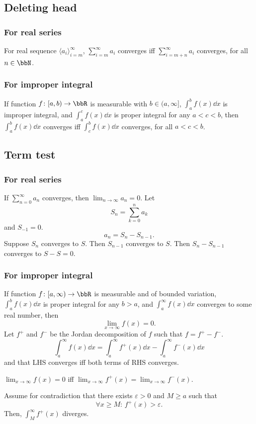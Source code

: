\documentclass[a4paper,12pt]{report}
\begin{document}
\begin{itemize}
\begin{itemize}
\subsection{Deleting head}
\subsubsection{For real series}
For real sequence $\langle a_i\rangle_{i=m}^{\infty}$, $\sum_{i=m}^{\infty}a_i$ converges iff $\sum_{i=m+n}^{\infty}a_i$ converges, for all $n\in\bbN$.
\subsubsection{For improper integral}
If function $f\colon [a,b)\to\bbR$ is measurable with $b\in(a,\infty]$, $\int_a^bf(x)\dd{x}$ is improper integral, and $\int_a^cf(x)\dd{x}$ is proper integral for any $a<c<b$, then $\int_a^bf(x)\dd{x}$ converges iff $\int_c^bf(x)\dd{x}$ converges, for all $a<c<b$.
\subsection{Term test}
\subsubsection{For real series}
If $\sum_{n=0}^{\infty}a_n$ converges, then $\lim_{n\to\infty}a_n=0$.
\bpr
Let
\[S_n=\sum_{k=0}^na_k\]
and $S_{-1}=0$.
\[a_n=S_n-S_{n-1}.\]
Suppose $S_n$ converges to $S$. Then $S_{n-1}$ converges to $S$. Then $S_n-S_{n-1}$ converges to $S-S=0$.
\epr
\subsubsection{For improper integral}
If function $f\colon [a,\infty)\to\bbR$ is measurable and of bounded variation, $\int_a^bf(x)\dd{x}$ is proper integral for any $b>a$, and $\int_a^{\infty}f(x)\dd{x}$ converges to some real number, then
\[\lim_{x\to\infty}f(x)=0.\]
\bpr
Let $f^+$ and $f^-$ be the Jordan decomposition of $f$ such that $f=f^+-f^-$.
\[\int_a^{\infty}f(x)\dd{x}=\int_a^{\infty}f^+(x)\dd{x}-\int_a^{\infty}f^-(x)\dd{x}\]
and that LHS converges iff both terms of RHS converges.

$\lim_{x\to\infty}f(x)=0$ iff $\lim_{x\to\infty}f^+(x)=\lim_{x\to\infty}f^-(x)$.

Assume for contradiction that there exists $\varepsilon>0$ and $M\geq a$ such that
\[\forall x\geq M:\,f^+(x)>\varepsilon.\]
Then, $\int_M^{\infty}f^+(x)$ diverges.


\end{itemize}
\end{itemize}
\end{document}
